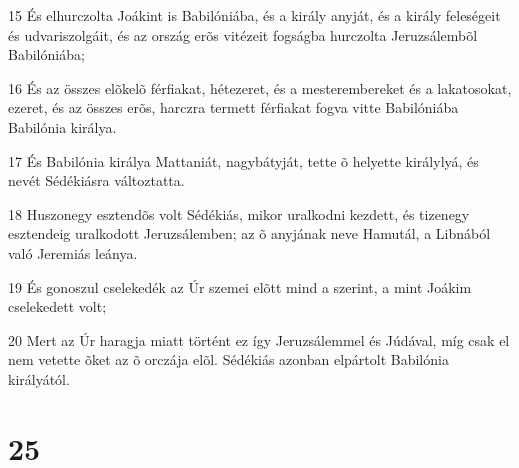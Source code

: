 \par 15 És elhurczolta Joákint is Babilóniába, és a király anyját, és a király feleségeit és udvariszolgáit, és az ország erõs vitézeit fogságba hurczolta Jeruzsálembõl Babilóniába;
\par 16 És az összes elõkelõ férfiakat, hétezeret, és a mesterembereket és a lakatosokat, ezeret, és az összes erõs, harczra termett férfiakat fogva vitte Babilóniába Babilónia királya.
\par 17 És Babilónia királya Mattaniát, nagybátyját, tette õ helyette királylyá, és nevét Sédékiásra változtatta.
\par 18 Huszonegy esztendõs volt Sédékiás, mikor uralkodni kezdett, és tizenegy esztendeig uralkodott Jeruzsálemben; az õ anyjának neve Hamutál, a Libnából való Jeremiás leánya.
\par 19 És gonoszul cselekedék az Úr szemei elõtt mind a szerint, a mint Joákim cselekedett volt;
\par 20 Mert az Úr haragja miatt történt ez így Jeruzsálemmel és Júdával, míg csak el nem vetette õket az õ orczája elõl. Sédékiás azonban elpártolt Babilónia királyától.

\chapter{25}

